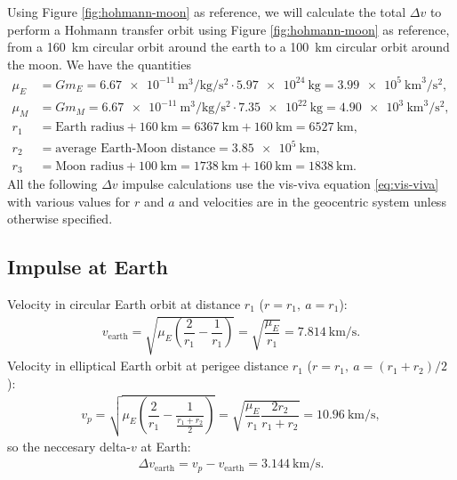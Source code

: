 Using Figure \ref{fig:hohmann-moon} as reference, we will calculate the total $\Delta v$ to perform a Hohmann transfer orbit using Figure \ref{fig:hohmann-moon} as reference, from a \SI{160}{\km} circular orbit around the earth to a \SI{100}{\km} circular orbit around the moon. We have the quantities \cite{ma}
\begin{align}
\mu_E &= G m_E = \SI[per-mode=fraction]{6.67e-11}{\m\cubed\per\kg\per\s\squared} \cdot \SI{5.97e24}{\kg} = \SI{3.99e5}{\km\cubed\per\s\squared}, \\[0.2cm]
\mu_M &= G m_M = \SI[per-mode=fraction]{6.67e-11}{\m\cubed\per\kg\per\s\squared} \cdot \SI{7.35e22}{\kg} = \SI{4.90e3}{\km\cubed\per\s\squared}, \\[0.2cm]
r_1 &= \text{Earth radius} + \SI{160}{\km} = \SI{6367}{\km}+ \SI{160}{\km} = \SI{6527}{\km}, \\[0.2cm]
r_2 &= \text{average Earth-Moon distance} = \SI{3.85e5}{\km}, \\[0.2cm]
r_3 &= \text{Moon radius} + \SI{100}{\km} = \SI{1738}{\km}+ \SI{160}{\km} = \SI{1838}{\km}.
\end{align}
All the following $\Delta v$ impulse calculations use the vis-viva equation \eqref{eq:vis-viva} with various values for $r$ and $a$ and velocities are in the geocentric system unless otherwise specified.

\subsection{Impulse at Earth}
Velocity in circular Earth orbit at distance $r_1$ ($r = r_1,\ a = r_1$):
\begin{align}
v_{\text{earth}} = \sqrt{\mu_E\left(\dfrac{2}{r_1} - \dfrac{1}{r_1}\right)} = \sqrt{\dfrac{\mu_E}{r_1}} = \SI{7.814}{\km\per\s}. \label{eq:v-earth}
\end{align}
Velocity in elliptical Earth orbit at perigee distance $r_1$ ($r = r_1,\ a = (r_1+r_2)/2$):
\begin{align}
v_p = \sqrt{\mu_E\left(\dfrac{2}{r_1} - \dfrac{1}{\frac{r_1+r_2}{2}}\right)} = \sqrt{\dfrac{\mu_E}{r_1} \dfrac{2 r_2}{r_1+r_2}} = \SI{10.96}{\km\per\s}, \label{eq:vp}
\end{align}
so the neccesary delta-$v$ at Earth:
\begin{align}
\Delta v_{\text{earth}} = v_p - v_{\text{earth}} = \SI{3.144}{\km\per\s}. \label{eq:deltav-earth}
\end{align}
